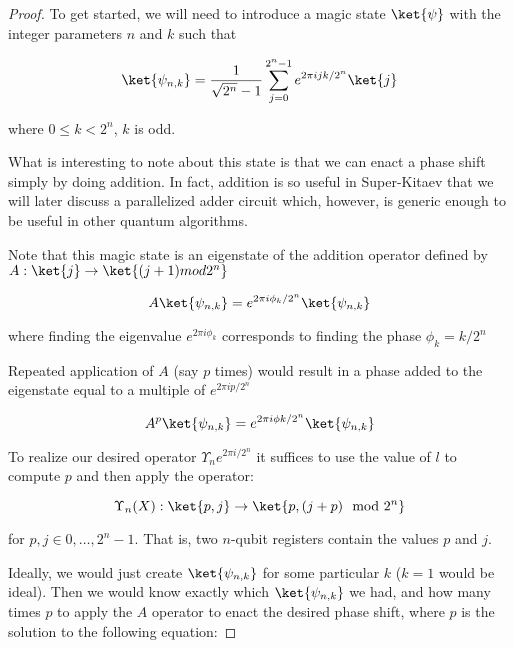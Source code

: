 \begin{proof}
To get started, we will need to introduce a magic state $\ket{\psi}$ with the
integer parameters $n$ and $k$ such that

\begin{equation}
\ket{\psi_{n,k}} = \frac{1}{\sqrt{2^n}-1} \sum_{j=0}^{2^n-1} e^{2\pi i j k / 2^n} \ket{j}
\end{equation}

where $0 \le k < 2^n$, $k$ is odd.

What is interesting to note about this state is that we can enact a phase
shift simply by doing addition. In fact, addition is so useful in Super-Kitaev
that we will later discuss a parallelized adder circuit which, however,
is generic enough to be useful in other quantum algorithms.


Note that this magic state is an eigenstate of the addition operator defined
by $A : \ket{j} \rightarrow \ket{(j+1) mod 2^n}$
 
\begin{equation}
A\ket{\psi_{n,k}} = e^{2\pi i \phi_k / 2^n} \ket{\psi_{n,k}}
\end{equation}

where finding the eigenvalue $e^{2\pi i \phi_k}$ corresponds to finding
the phase $\phi_k = k / 2^n$

Repeated application of $A$ (say $p$ times) would result in a phase
added to the eigenstate equal to a multiple of $e^{2\pi i p / 2^n}$

\begin{equation}
A^p\ket{\psi_{n,k}} = e^{2\pi i \phi k / 2^n} \ket{\psi_{n,k}}
\end{equation}

To realize our desired operator $\Upsilon_n{e^{2\pi i / 2^n}}$ it suffices
to use the value of $l$ to compute $p$ and then apply the operator:

\begin{equation}
\Upsilon_n(X) : \ket{p,j} \rightarrow \ket{p, (j+p) \mod 2^n}
\end{equation}

for $p,j \in {0,\ldots,2^n-1}$. That is, two $n$-qubit registers contain
the values $p$ and $j$.

Ideally, we would just create $\ket{\psi_{n,k}}$ for some particular $k$
($k=1$ would be ideal). Then we would know exactly which $\ket{\psi_{n,k}}$
we had, and how many times $p$ to apply the $A$ operator
to enact the desired phase shift, where $p$ is the solution to the
following equation:


\end{proof}
